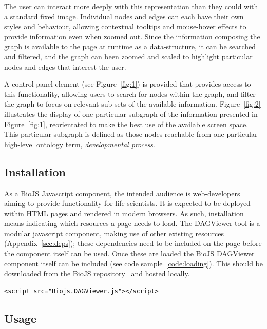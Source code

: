 \documentclass[10pt,a4paper,twocolumn]{article}
\begin{document}
The user can interact more deeply with this representation than they could with
a standard fixed image. Individual nodes and edges can each have their own
styles and behaviour, allowing contextual tooltips and mouse-hover effects to
provide information even when zoomed out. Since the information composing the
graph is available to the page at runtime as a data-structure, it can be
searched and filtered, and the graph can been zoomed and scaled to highlight
particular nodes and edges that interest the user.

A control panel element (see Figure~\ref{fig:1}) is provided that provides
access to this functionality, allowing users to search for nodes within the
graph, and filter the graph to focus on relevant sub-sets of the available
information. Figure~\ref{fig:2} illustrates the display of one particular
subgraph of the information presented in Figure~\ref{fig:1}, reorientated to
make the best use of the available screen space. This particular subgraph is
defined as those nodes reachable from one particular high-level ontology term,
\emph{developmental process}.

\subsection*{Installation}

As a BioJS Javascript component, the intended audience is web-developers aiming
to provide functionality for life-scientists. It is expected to be deployed
within HTML pages and rendered in modern browsers. As such,
installation means indicating which resources a page needs to load.  The
DAGViewer tool is a modular javascript component, making use of other existing
resources (Appendix~\ref{sec:deps}); these dependencies need to be
included on the page before the component itself can be used.  Once these are
loaded the BioJS DAGViewer component itself can be included (see code
sample~\ref{code:loading}).  This should be downloaded from the BioJS
repository~\cite{site:biojs-registry} and hosted locally.

\begin{lstlisting}[caption={Loading the DAG-Viewer Library}, label={code:loading}]
<script src="Biojs.DAGViewer.js"></script>
\end{lstlisting}

\subsection*{Usage}
\end{document}
